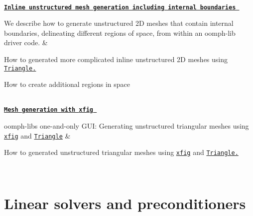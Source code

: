 \begin{longtabu}
\\
{\bfseries  \href{../../meshes/mesh_from_inline_triangle_internal_boundaries/html/index.html}{\tt Inline unstructured mesh generation including internal boundaries } }

We describe how to generate unstructured 2D meshes that contain internal boundaries, delineating different regions of space, from within an {\ttfamily oomph-\/lib} driver code.  &
\begin{DoxyItemize}
\item How to generated more complicated inline unstructured 2D meshes using \href{http://www.cs.cmu.edu/~quake/triangle.html}{\tt Triangle.}
\item How to create additional regions in space 
\end{DoxyItemize}



\\
{\bfseries  \label{_xfig_mesh}%
 \href{../../meshes/mesh_from_xfig/html/index.html}{\tt Mesh generation with {\ttfamily xfig} } }

{\ttfamily oomph-\/lib\textquotesingle{}s} one-\/and-\/only G\+UI\+: Generating unstructured triangular meshes using \href{http://en.wikipedia.org/wiki/Xfig}{\tt xfig} and \href{http://www.cs.cmu.edu/~quake/triangle.html}{\tt Triangle}  &
\begin{DoxyItemize}
\item How to generated unstructured triangular meshes using \href{http://en.wikipedia.org/wiki/Xfig}{\tt xfig} and \href{http://www.cs.cmu.edu/~quake/triangle.html}{\tt Triangle.} 
\end{DoxyItemize}

\\
\end{longtabu}


\label{_solvers}%
\section*{Linear solvers and preconditioners}

